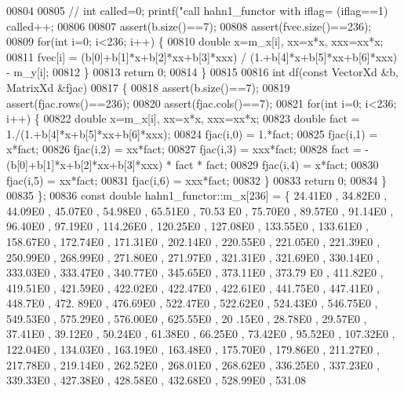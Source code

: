 \begin{DoxyCode}
00804 
00805         \textcolor{comment}{//        int called=0; printf("call hahn1\_functor with  iflag=%
       (iflag==1) called++;}
00806 
00807         assert(b.size()==7);
00808         assert(fvec.size()==236);
00809         \textcolor{keywordflow}{for}(\textcolor{keywordtype}{int} i=0; i<236; i++) \{
00810             \textcolor{keywordtype}{double} x=m\_x[i], xx=x*x, xxx=xx*x;
00811             fvec[i] = (b[0]+b[1]*x+b[2]*xx+b[3]*xxx) / (1.+b[4]*x+b[5]*xx+b[6]*xxx) - m\_y[i];
00812         \}
00813         \textcolor{keywordflow}{return} 0;
00814     \}
00815 
00816     \textcolor{keywordtype}{int} df(\textcolor{keyword}{const} VectorXd &b, MatrixXd &fjac)
00817     \{
00818         assert(b.size()==7);
00819         assert(fjac.rows()==236);
00820         assert(fjac.cols()==7);
00821         \textcolor{keywordflow}{for}(\textcolor{keywordtype}{int} i=0; i<236; i++) \{
00822             \textcolor{keywordtype}{double} x=m\_x[i], xx=x*x, xxx=xx*x;
00823             \textcolor{keywordtype}{double} fact = 1./(1.+b[4]*x+b[5]*xx+b[6]*xxx);
00824             fjac(i,0) = 1.*fact;
00825             fjac(i,1) = x*fact;
00826             fjac(i,2) = xx*fact;
00827             fjac(i,3) = xxx*fact;
00828             fact = - (b[0]+b[1]*x+b[2]*xx+b[3]*xxx) * fact * fact;
00829             fjac(i,4) = x*fact;
00830             fjac(i,5) = xx*fact;
00831             fjac(i,6) = xxx*fact;
00832         \}
00833         \textcolor{keywordflow}{return} 0;
00834     \}
00835 \};
00836 \textcolor{keyword}{const} \textcolor{keywordtype}{double} hahn1\_functor::m\_x[236] = \{ 24.41E0 , 34.82E0 , 44.09E0 , 45.07E0 , 54.98E0 , 65.51E0 , 70.53
      E0 , 75.70E0 , 89.57E0 , 91.14E0 , 96.40E0 , 97.19E0 , 114.26E0 , 120.25E0 , 127.08E0 , 133.55E0 , 133.61E0 ,
       158.67E0 , 172.74E0 , 171.31E0 , 202.14E0 , 220.55E0 , 221.05E0 , 221.39E0 , 250.99E0 , 268.99E0 , 271.80E0
       , 271.97E0 , 321.31E0 , 321.69E0 , 330.14E0 , 333.03E0 , 333.47E0 , 340.77E0 , 345.65E0 , 373.11E0 , 373.79
      E0 , 411.82E0 , 419.51E0 , 421.59E0 , 422.02E0 , 422.47E0 , 422.61E0 , 441.75E0 , 447.41E0 , 448.7E0  , 472.
      89E0 , 476.69E0 , 522.47E0 , 522.62E0 , 524.43E0 , 546.75E0 , 549.53E0 , 575.29E0 , 576.00E0 , 625.55E0 , 20
      .15E0 , 28.78E0 , 29.57E0 , 37.41E0 , 39.12E0 , 50.24E0 , 61.38E0 , 66.25E0 , 73.42E0 , 95.52E0 , 107.32E0 ,
       122.04E0 , 134.03E0 , 163.19E0 , 163.48E0 , 175.70E0 , 179.86E0 , 211.27E0 , 217.78E0 , 219.14E0 , 262.52E0
       , 268.01E0 , 268.62E0 , 336.25E0 , 337.23E0 , 339.33E0 , 427.38E0 , 428.58E0 , 432.68E0 , 528.99E0 , 531.08

\end{DoxyCode}
